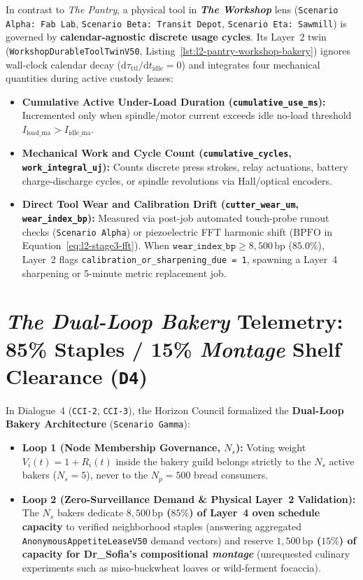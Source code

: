 In contrast to \textit{The Pantry}, a physical tool in \textbf{\textit{The Workshop}} lens (\texttt{Scenario Alpha: Fab Lab}, \texttt{Scenario Beta: Transit Depot}, \texttt{Scenario Eta: Sawmill}) is governed by \textbf{calendar-agnostic discrete usage cycles}. Its Layer~2 twin (\texttt{WorkshopDurableToolTwinV50}, Listing~\ref{lst:l2-pantry-workshop-bakery}) ignores wall-clock calendar decay ($\mathrm{d}\tau_{\mathrm{ttl}}/\mathrm{d}t_{\mathrm{idle}} = 0$) and integrates four mechanical quantities during active custody leases:
\begin{itemize}
    \item \textbf{Cumulative Active Under-Load Duration (\texttt{cumulative\_use\_ms}):} Incremented only when spindle/motor current exceeds idle no-load threshold $I_{\mathrm{load\_ma}} > I_{\mathrm{idle\_ma}}$.
    \item \textbf{Mechanical Work and Cycle Count (\texttt{cumulative\_cycles}, \texttt{work\_integral\_uj}):} Counts discrete press strokes, relay actuations, battery charge-discharge cycles, or spindle revolutions via Hall/optical encoders.
    \item \textbf{Direct Tool Wear and Calibration Drift (\texttt{cutter\_wear\_um}, \texttt{wear\_index\_bp}):} Measured via post-job automated touch-probe runout checks (\texttt{Scenario Alpha}) or piezoelectric FFT harmonic shift ($\mathrm{BPFO}$ in Equation~\eqref{eq:l2-stage3-fft}). When $\mathtt{wear\_index\_bp} \ge 8{,}500\,\mathrm{bp}$ ($85.0\%$), Layer~2 flags \texttt{calibration\_or\_sharpening\_due = 1}, spawning a Layer~4 sharpening or 5-minute metric replacement job.
\end{itemize}

\section{\textit{The Dual-Loop Bakery} Telemetry: 85\% Staples / 15\% \textit{Montage} Shelf Clearance (\texttt{D4})}
\label{sec:l2-dual-loop-bakery-telemetry}

In Dialogue~4 (\texttt{CCI-2}, \texttt{CCI-3}), the Horizon Council formalized the \textbf{Dual-Loop Bakery Architecture} (\texttt{Scenario Gamma}):
\begin{itemize}
    \item \textbf{Loop 1 (Node Membership Governance, $N_s$):} Voting weight $V_i(t) = 1 + R_i(t)$ inside the bakery guild belongs strictly to the $N_s$ active bakers ($N_s = 5$), never to the $N_p = 500$ bread consumers.
    \item \textbf{Loop 2 (Zero-Surveillance Demand \& Physical Layer~2 Validation):} The $N_s$ bakers dedicate \textbf{$8{,}500\,\mathrm{bp}$ ($85\%$) of Layer~4 oven schedule capacity} to verified neighborhood staples (answering aggregated \texttt{AnonymousAppetiteLeaseV50} demand vectors) and reserve \textbf{$1{,}500\,\mathrm{bp}$ ($15\%$) of capacity for Dr\_Sofia's compositional \textit{montage}} (unrequested culinary experiments such as miso-buckwheat loaves or wild-ferment focaccia).
\end{itemize}


